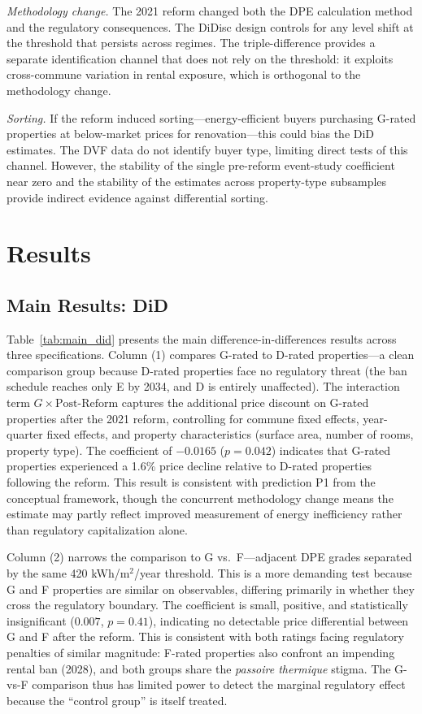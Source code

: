 \documentclass[12pt]{article}
\begin{document}
\textit{Methodology change.} The 2021 reform changed both the DPE calculation method and the regulatory consequences. The DiDisc design controls for any level shift at the threshold that persists across regimes. The triple-difference provides a separate identification channel that does not rely on the threshold: it exploits cross-commune variation in rental exposure, which is orthogonal to the methodology change.

\textit{Sorting.} If the reform induced sorting---energy-efficient buyers purchasing G-rated properties at below-market prices for renovation---this could bias the DiD estimates. The DVF data do not identify buyer type, limiting direct tests of this channel. However, the stability of the single pre-reform event-study coefficient near zero and the stability of the estimates across property-type subsamples provide indirect evidence against differential sorting.


\section{Results}

\subsection{Main Results: DiD}



Table~\ref{tab:main_did} presents the main difference-in-differences results across three specifications. Column (1) compares G-rated to D-rated properties---a clean comparison group because D-rated properties face no regulatory threat (the ban schedule reaches only E by 2034, and D is entirely unaffected). The interaction term $G \times \text{Post-Reform}$ captures the additional price discount on G-rated properties after the 2021 reform, controlling for commune fixed effects, year-quarter fixed effects, and property characteristics (surface area, number of rooms, property type). The coefficient of $-0.0165$ ($p = 0.042$) indicates that G-rated properties experienced a 1.6\% price decline relative to D-rated properties following the reform. This result is consistent with prediction P1 from the conceptual framework, though the concurrent methodology change means the estimate may partly reflect improved measurement of energy inefficiency rather than regulatory capitalization alone.

Column (2) narrows the comparison to G vs.\ F---adjacent DPE grades separated by the same 420 kWh/m$^2$/year threshold. This is a more demanding test because G and F properties are similar on observables, differing primarily in whether they cross the regulatory boundary. The coefficient is small, positive, and statistically insignificant ($0.007$, $p = 0.41$), indicating no detectable price differential between G and F after the reform. This is consistent with both ratings facing regulatory penalties of similar magnitude: F-rated properties also confront an impending rental ban (2028), and both groups share the \textit{passoire thermique} stigma. The G-vs-F comparison thus has limited power to detect the marginal regulatory effect because the ``control group'' is itself treated.
\end{document}
